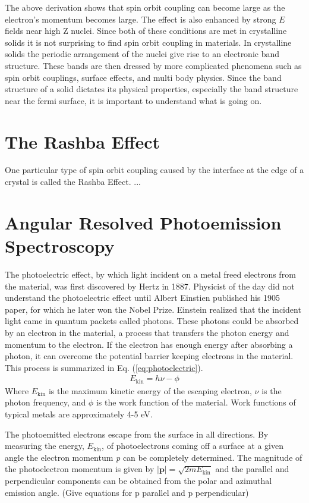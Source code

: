 \documentclass[12pt]{article}
\begin{document}
The above derivation shows that spin orbit coupling can become large as the electron's momentum becomes large.
The effect is also enhanced by strong $E$ fields near high Z nuclei.
Since both of these conditions are met in crystalline solids it is not surprising to find spin orbit coupling in materials.
In crystalline solids the periodic arrangement of the nuclei give rise to an electronic band structure.
These bands are then dressed by more complicated phenomena such as spin orbit couplings, surface effects, and multi body physics.
Since the band structure of a solid dictates its physical properties, especially the band structure near the fermi surface, it is important to understand what is going on.

\section{The Rashba Effect}
One particular type of spin orbit coupling caused by the interface at the edge of a crystal is called the Rashba Effect.
...
\section{Angular Resolved Photoemission Spectroscopy}
The photoelectric effect, by which light incident on a metal freed electrons from the material, was first discovered by Hertz in 1887.
Physicist of the day did not understand the photoelectric effect until Albert Einstien published his 1905 paper, for which he later won the Nobel Prize.
Einstein realized that the incident light came in quantum packets called photons.
These photons could be absorbed by an electron in the material, a process that transfers the photon energy and momentum to the electron.
If the electron has enough energy after absorbing a photon, it can overcome the potential barrier keeping electrons in the material.
This process is summarized in Eq. (\ref{eq:photoelectric}).
\begin{align}
  \label{eq:photoelectric}
  E_{\text{kin}}=h\nu-\phi
\end{align}
Where $E_{\text{kin}}$ is the maximum kinetic energy of the escaping electron, $\nu$ is the photon frequency, and $\phi$ is the work function of the material.
Work functions of typical metals are approximately 4-5 eV.

The photoemitted electrons escape from the surface in all directions.
By measuring the energy, $E_{\text{kin}}$, of photoelectrons coming off a surface at a given angle the electron momentum \emph{p} can be completely determined.
The magnitude of the photoelectron momentum is given by $|\boldsymbol{p}|=\sqrt{2mE_{\text{kin}}}$ and the parallel and perpendicular components can be obtained from the polar and azimuthal emission angle.
(Give equations for p parallel and p perpendicular)
\end{document}

